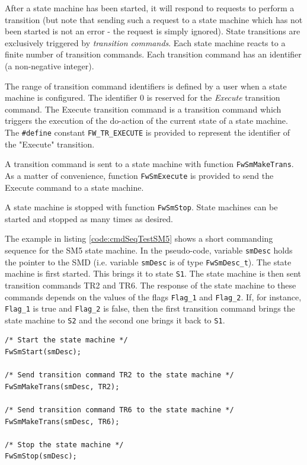 \documentclass[a4paper,10pt]{article}
\begin{document}
After a state machine has been started, it will respond to requests to perform a transition (but note that sending 
such a request to a state machine which has not been started is not an error - the request is simply ignored). 
State transitions are exclusively triggered by \emph{transition commands}. Each state machine reacts to a finite 
number of transition commands. Each transition command has an identifier (a non-negative integer). 

The range of transition command identifiers is defined by a user when a state machine is configured. The identifier 0 
is reserved for the \emph{Execute} transition command. The Execute transition command is a transition command which 
triggers the execution of the do-action of the current state of a state machine. The \texttt{\#define} constant 
\texttt{FW\_TR\_EXECUTE} is provided to represent the identifier of the "Execute" transition.

A transition command is sent to a state machine with function \texttt{FwSmMakeTrans}. As a matter of convenience, 
function \texttt{FwSmExecute} is provided to send the Execute command to a state machine.

A state machine is stopped with function \texttt{FwSmStop}. State machines can be started and stopped as many times 
as desired.

The example in listing \ref{code:cmdSeqTestSM5} shows a short commanding sequence for the SM5 state machine. 
In the pseudo-code, variable 
\texttt{smDesc} holds the pointer to the SMD (i.e. variable \texttt{smDesc} is of type \texttt{FwSmDesc\_t}). 
The state machine is first started. This brings it to state \texttt{S1}. The state machine is then sent transition 
commands TR2 and TR6. The response of the state machine to these commands depends on the values of the flags 
\texttt{Flag\_1} and \texttt{Flag\_2}. If, for instance, \texttt{Flag\_1} is true and \texttt{Flag\_2} is false, 
then the first transition command brings the state machine to \texttt{S2} and the second one brings it back to \texttt{S1}.

\begin{lstlisting}
/* Start the state machine */
FwSmStart(smDesc);

/* Send transition command TR2 to the state machine */
FwSmMakeTrans(smDesc, TR2);

/* Send transition command TR6 to the state machine */
FwSmMakeTrans(smDesc, TR6);

/* Stop the state machine */
FwSmStop(smDesc);
\end{lstlisting}
\end{document}
